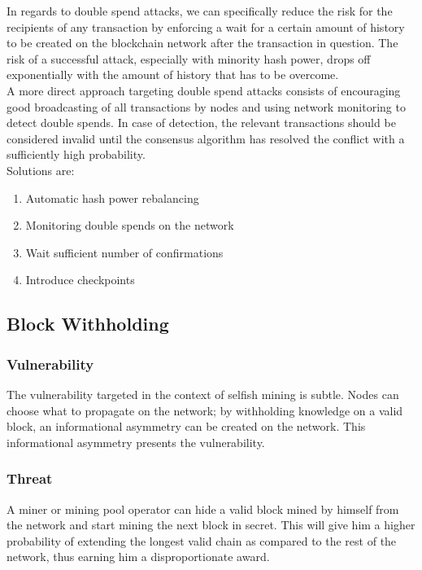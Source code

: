 \documentclass[11pt,a4paper,draft]{article}
\begin{document}
In regards to double spend attacks, we can specifically reduce the risk for the recipients of any transaction by enforcing a wait for a certain amount of history to be created on the blockchain network after the transaction in question. The risk of a successful attack, especially with minority hash power, drops off exponentially with the amount of history that has to be overcome.\\

A more direct approach targeting double spend attacks consists of encouraging good broadcasting of all transactions by nodes and using network monitoring to detect double spends. In case of detection, the relevant transactions should be considered invalid until the consensus algorithm has resolved the conflict with a sufficiently high probability.\\

Solutions are:
\begin{enumerate}
  \item Automatic hash power rebalancing
  \item Monitoring double spends on the network
  \item Wait sufficient number of confirmations
  \item Introduce checkpoints
\end{enumerate}

\subsection{Block Withholding}

\subsubsection{Vulnerability}

The vulnerability targeted in the context of selfish mining is subtle. Nodes can choose what to propagate on the network; by withholding knowledge on a valid block, an informational asymmetry can be created on the network. This informational asymmetry presents the vulnerability.\\

\subsubsection{Threat}

A miner or mining pool operator can hide a valid block mined by himself from the network and start mining the next block in secret. This will give him a higher probability of extending the longest valid chain as compared to the rest of the network, thus earning him a disproportionate award.\\
\end{document}

